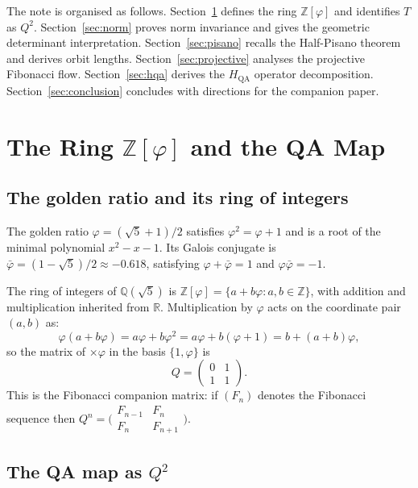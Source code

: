 \documentclass[11pt]{article}
\theoremstyle{definition}
\theoremstyle{remark}
\newcommand{\Zfi}{\mathbb{Z}[\varphi]}
\newcommand{\Qfi}{\mathbb{Q}(\sqrt{5})}
\newcommand{\hqa}{H_{\mathrm{QA}}}
\begin{document}
The note is organised as follows.  Section~\ref{sec:ring} defines the ring
$\Zfi$ and identifies $T$ as $Q^2$.  Section~\ref{sec:norm} proves norm
invariance and gives the geometric determinant interpretation.
Section~\ref{sec:pisano} recalls the Half-Pisano theorem and derives orbit
lengths.  Section~\ref{sec:projective} analyses the projective Fibonacci flow.
Section~\ref{sec:hqa} derives the $\hqa$ operator decomposition.
Section~\ref{sec:conclusion} concludes with directions for the companion paper.

\section{The Ring $\Zfi$ and the QA Map}
\label{sec:ring}

\subsection{The golden ratio and its ring of integers}

The golden ratio $\varphi=(\sqrt{5}+1)/2$ satisfies $\varphi^2=\varphi+1$ and is
a root of the minimal polynomial $x^2-x-1$.  Its Galois conjugate is
$\bar\varphi=(1-\sqrt{5})/2\approx-0.618$, satisfying $\varphi+\bar\varphi=1$ and
$\varphi\bar\varphi=-1$.

The ring of integers of $\Qfi$ is $\Zfi=\{a+b\varphi:a,b\in\mathbb{Z}\}$, with
addition and multiplication inherited from $\mathbb{R}$.  Multiplication by
$\varphi$ acts on the coordinate pair $(a,b)$ as:
\[
  \varphi(a+b\varphi)=a\varphi+b\varphi^2=a\varphi+b(\varphi+1)=b+(a+b)\varphi,
\]
so the matrix of ${\times}\varphi$ in the basis $\{1,\varphi\}$ is
\[
  Q = \begin{pmatrix}0&1\\1&1\end{pmatrix}.
\]
This is the Fibonacci companion matrix: if $(F_n)$ denotes the Fibonacci
sequence then $Q^n=\bigl(\begin{smallmatrix}F_{n-1}&F_n\\F_n&F_{n+1}
\end{smallmatrix}\bigr)$.

\subsection{The QA map as $Q^2$}
\end{document}
